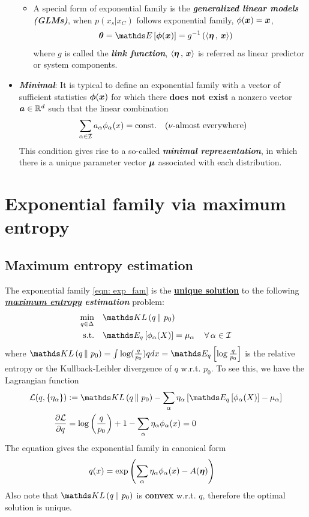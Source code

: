 \documentclass[11pt]{article}
\begin{document}
\begin{itemize}
\begin{itemize}
\item A special form of exponential family is the \emph{\textbf{generalized linear models (GLMs)}}, when $p(x_s | x_{C})$ follows exponential family, $\phi(\boldsymbol{x}) = \boldsymbol{x}$, 
\begin{align}
\mb{\theta} = \E{}{\mb{\phi}(\mb{x})} &= g^{-1}\paren{ \inn{\mb{\eta}}{\mb{x}}} \label{eqn: glm}
\end{align} where $g$ is called the \emph{\textbf{link function}}, $\left\langle \boldsymbol{\eta}\,,\, \boldsymbol{x} \right\rangle$ is referred as linear predictor or system components.
\end{itemize}

\item \textbf{\emph{Minimal}}: It is typical to define an exponential family with a vector of sufficient statistics $\boldsymbol{\phi}(\boldsymbol{x})$ for which there \textbf{does not exist} a
nonzero vector $\boldsymbol{a} \in {\mathbb R}^d$ such that the linear combination
\begin{align*}
\sum_{\alpha \in {\mathcal I}}a_{\alpha} \phi_{\alpha}(x) = \text{const.} \quad (\nu\text{-almost everywhere})
\end{align*} This condition gives rise to a so-called \emph{\textbf{minimal representation}}, in which there is a unique parameter vector $\boldsymbol{\mu}$ associated with each distribution.
\end{itemize}

\newpage
\section{Exponential family via maximum entropy}
\subsection{Maximum entropy estimation}
The exponential family \eqref{eqn: exp_fam} is the \underline{\textbf{unique solution}} to the following \textbf{\emph{\underline{maximum entropy} estimation}} problem: 
\begin{align}
\min_{q \in \Delta}&\quad \kl{q}{p_{0}} \label{eqn: max_ent}\\
\text{s.t.}&\quad \E{q}{\phi_{\alpha}(X)} = \mu_{\alpha}\,\quad  \forall\, \alpha \in \cI   \label{eqn: max_ent_mean_constraint}
\end{align} where $\kl{q}{p_0} = \int \log(\frac{q}{p_0}) q dx = \E{q}{\log\frac{q}{p_0}}$ is the relative entropy or the Kullback-Leibler divergence of $q$ w.r.t. $p_0$. To see this, we have the Lagrangian function
\begin{align*}
\cL(q,\{ \eta_{\alpha}\}) &:=  \kl{q}{p_{0}} - \sum_{\alpha }\eta_{\alpha}\brac{\E{q}{\phi_{\alpha}(X)} - \mu_{\alpha}} \\
\partdiff{\cL}{q} &= \log\paren{\frac{q}{p_0}} + 1 -\sum_{\alpha }\eta_{\alpha}\phi_{\alpha}(x) = 0
\end{align*} The equation gives the exponential family in canonical form
\begin{align*}
q(x) &= \exp\left(\sum_{\alpha }\eta_{\alpha}\phi_{\alpha}(x) - A(\boldsymbol{\eta}) \right) 
\end{align*} Also note that $\kl{q}{p_{0}}$ is \textbf{convex} w.r.t. $q$, therefore the optimal solution is unique.
\end{document}
